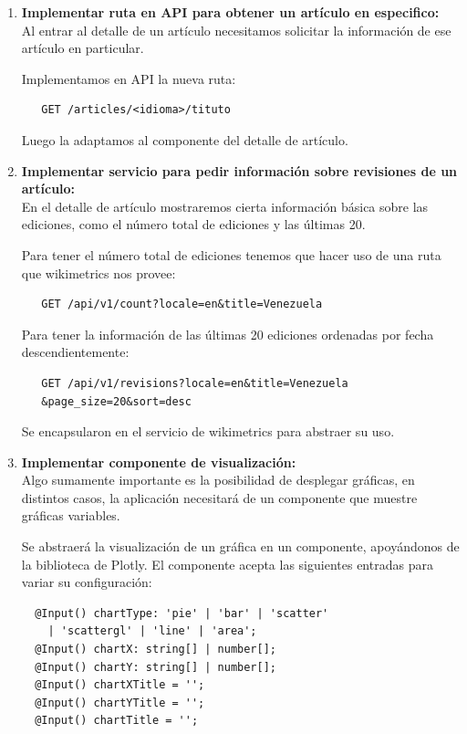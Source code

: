 \begin{enumerate}
  \item\textbf{Implementar ruta en API para obtener un artículo en especifico:}\\

  Al entrar al detalle de un artículo necesitamos solicitar la información de ese artículo en particular.
  
  Implementamos en API la nueva ruta:
  \begin{verbatim}
   GET /articles/<idioma>/tituto
  \end{verbatim}
  
  Luego la adaptamos al componente del detalle de artículo.
  
  \item\textbf{Implementar servicio para pedir información sobre revisiones de un artículo:}\\

  En el detalle de artículo mostraremos cierta información básica sobre las ediciones, como el número total de ediciones y las últimas 20.
  
  Para tener el número total de ediciones tenemos que hacer uso de una ruta que wikimetrics nos provee:
  
  \begin{verbatim}
   GET /api/v1/count?locale=en&title=Venezuela
  \end{verbatim}
  
  Para tener la información de las últimas 20 ediciones ordenadas por fecha descendientemente:
  \begin{verbatim}
   GET /api/v1/revisions?locale=en&title=Venezuela
   &page_size=20&sort=desc
  \end{verbatim}
  
  Se encapsularon en el servicio de wikimetrics para abstraer su uso.

  \item\textbf{Implementar componente de visualización:}\\

  Algo sumamente importante es la posibilidad de desplegar gráficas, en distintos casos, la aplicación necesitará de un componente que muestre gráficas variables.
  
  Se abstraerá la visualización de un gráfica en un componente, apoyándonos de la biblioteca de Plotly. El componente acepta las siguientes entradas para variar su configuración:
  
  \begin{verbatim}
  @Input() chartType: 'pie' | 'bar' | 'scatter'
    | 'scattergl' | 'line' | 'area';
  @Input() chartX: string[] | number[];
  @Input() chartY: string[] | number[];
  @Input() chartXTitle = '';
  @Input() chartYTitle = '';
  @Input() chartTitle = '';
  \end{verbatim}
  

\end{enumerate}
